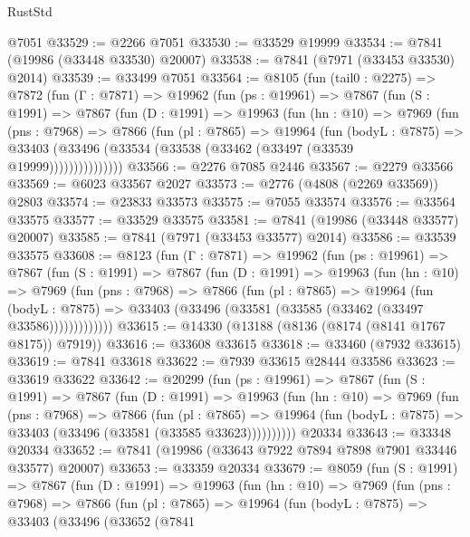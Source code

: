 \begin{lexlean}{RustStd}
\begin{coremodule}
    @7051
@33529 := @2266 @7051
@33530 := @33529 @19999
@33534 := @7841 (@19986 (@33448 @33530) @20007)
@33538 := @7841 (@7971 (@33453 @33530) @2014)
@33539 := @33499 @7051
@33564 := @8105
    (fun (tail0 : @2275) =>
    @7872
      (fun (Γ : @7871) =>
      @19962
        (fun (ps : @19961) =>
        @7867
          (fun (S : @1991) =>
          @7867
            (fun (D : @1991) =>
            @19963
              (fun (hn : @10) =>
              @7969
                (fun (pns : @7968) =>
                @7866
                  (fun (pl : @7865) =>
                  @19964
                    (fun (bodyL : @7875) =>
                    @33403 (@33496 (@33534 (@33538 (@33462 (@33497 (@33539 @19999)))))))))))))))
@33566 := @2276 @7085 @2446
@33567 := @2279 @33566
@33569 := @6023 @33567 @2027
@33573 := @2776 (@4808 (@2269 @33569)) @2803
@33574 := @23833 @33573
@33575 := @7055 @33574
@33576 := @33564 @33575
@33577 := @33529 @33575
@33581 := @7841 (@19986 (@33448 @33577) @20007)
@33585 := @7841 (@7971 (@33453 @33577) @2014)
@33586 := @33539 @33575
@33608 := @8123
    (fun (Γ : @7871) =>
    @19962
      (fun (ps : @19961) =>
      @7867
        (fun (S : @1991) =>
        @7867
          (fun (D : @1991) =>
          @19963
            (fun (hn : @10) =>
            @7969
              (fun (pns : @7968) =>
              @7866
                (fun (pl : @7865) =>
                @19964
                  (fun (bodyL : @7875) =>
                  @33403 (@33496 (@33581 (@33585 (@33462 (@33497 @33586)))))))))))))
@33615 := @14330 (@13188 (@8136 (@8174 (@8141 @1767 @8175)) @7919))
@33616 := @33608 @33615
@33618 := @33460 (@7932 @33615)
@33619 := @7841 @33618
@33622 := @7939 @33615 @28444 @33586
@33623 := @33619 @33622
@33642 := @20299
    (fun (ps : @19961) =>
    @7867
      (fun (S : @1991) =>
      @7867
        (fun (D : @1991) =>
        @19963
          (fun (hn : @10) =>
          @7969
            (fun (pns : @7968) =>
            @7866
              (fun (pl : @7865) =>
              @19964 (fun (bodyL : @7875) => @33403 (@33496 (@33581 (@33585 @33623))))))))))
    @20334
@33643 := @33348 @20334
@33652 := @7841 (@19986 (@33643 @7922 @7894 @7898 @7901 @33446 @33577) @20007)
@33653 := @33359 @20334
@33679 := @8059
    (fun (S : @1991) =>
    @7867
      (fun (D : @1991) =>
      @19963
        (fun (hn : @10) =>
        @7969
          (fun (pns : @7968) =>
          @7866
            (fun (pl : @7865) =>
            @19964
              (fun (bodyL : @7875) =>
              @33403
                (@33496
                  (@33652
                    (@7841

\end{coremodule}
\end{lexlean}
